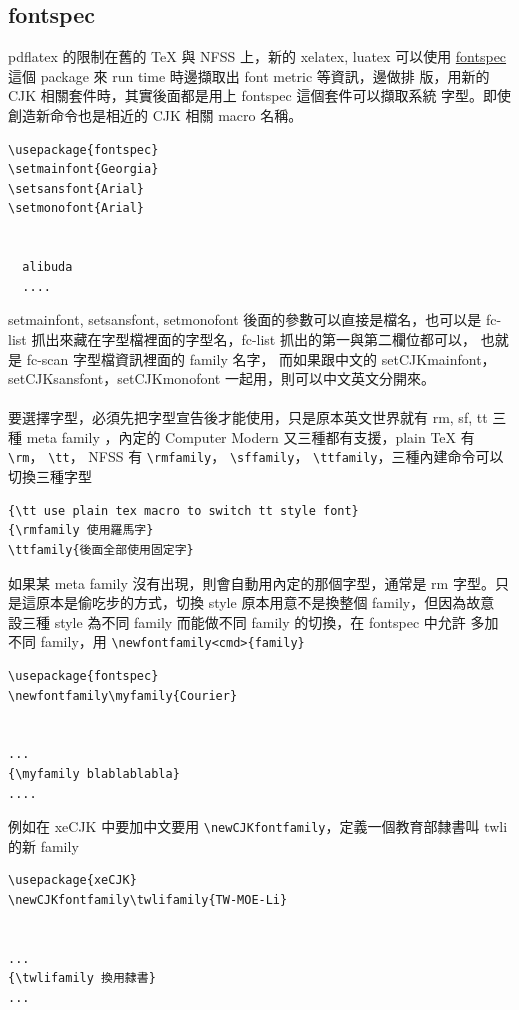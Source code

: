   \subsection{fontspec}
  pdflatex 的限制在舊的 \TeX{} 與 NFSS 上，新的 xelatex, luatex 可以使用
  \href{https://www.tug.org/texlive/devsrc/Master/texmf-dist/doc/latex/fontspec/fontspec.pdf}
  {fontspec} 這個 package 來 run time 時邊擷取出 font metric 等資訊，邊做排
  版，用新的 CJK 相關套件時，其實後面都是用上 fontspec 這個套件可以擷取系統
  字型。即使創造新命令也是相近的 CJK 相關 macro 名稱。
  \begin{verbatim}
\usepackage{fontspec}
\setmainfont{Georgia}
\setsansfont{Arial}
\setmonofont{Arial}


  alibuda
  ....

  \end{verbatim}
  setmainfont, setsansfont, setmonofont 後面的參數可以直接是檔名，也可以是
  fc-list 抓出來藏在字型檔裡面的字型名，fc-list 抓出的第一與第二欄位都可以，
  也就是 fc-scan 字型檔資訊裡面的 family 名字， 而如果跟中文的 setCJKmainfont，
  setCJKsansfont，setCJKmonofont 一起用，則可以中文英文分開來。
  \\\\
  要選擇字型，必須先把字型宣告後才能使用，只是原本英文世界就有 rm, sf, tt
  三種 meta family ，內定的 Computer Modern 又三種都有支援，plain \TeX{} 有
  \verb=\rm=， \verb=\tt=， \LaTeXe{} NFSS 有 \verb=\rmfamily=，
  \verb=\sffamily=， \verb=\ttfamily=，三種內建命令可以切換三種字型
  \begin{verbatim}
{\tt use plain tex macro to switch tt style font}
{\rmfamily 使用羅馬字}
\ttfamily{後面全部使用固定字}
  \end{verbatim}

  如果某 meta family 沒有出現，則會自動用內定的那個字型，通常是 rm 字型。只
  是這原本是偷吃步的方式，切換 style 原本用意不是換整個 family，但因為故意
  設三種 style 為不同 family 而能做不同 family 的切換，在 fontspec 中允許
  多加不同 family，用 \verb=\newfontfamily<cmd>{family}=

  \begin{verbatim}
\usepackage{fontspec}
\newfontfamily\myfamily{Courier}


...
{\myfamily blablablabla}
....

  \end{verbatim}

  例如在 xeCJK 中要加中文要用 \verb=\newCJKfontfamily=，定義一個教育部隸書叫
  twli 的新 family

  \begin{verbatim}
\usepackage{xeCJK}
\newCJKfontfamily\twlifamily{TW-MOE-Li}


...
{\twlifamily 換用隸書}
...

  \end{verbatim}

